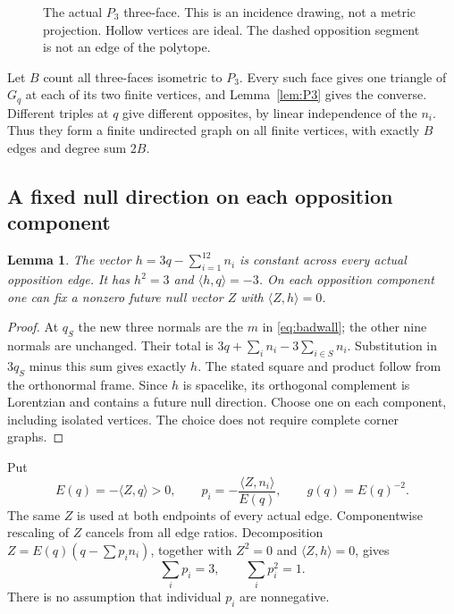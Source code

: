 \documentclass[11pt]{article}
\newtheorem{lemma}[theorem]{Lemma}
\newcommand{\ip}[2]{\langle #1,#2\rangle}
\newcommand{\Pthree}{P_3}
\begin{document}
\begin{figure}[ht]
\centering
{}
\caption{The actual $\Pthree$ three-face. This is an incidence drawing,
not a metric projection. Hollow vertices are ideal. The dashed
opposition segment is not an edge of the polytope.}
\label{fig:P3}
\end{figure}

Let $B$ count all three-faces isometric to $\Pthree$. Every such
face gives one triangle of $G_q$ at each of its two finite vertices,
and Lemma~\ref{lem:P3} gives the converse. Different triples at $q$
give different opposites, by linear independence of the $n_i$.
Thus they form a finite undirected graph on all finite vertices,
with exactly $B$ edges and degree sum $2B$.

\subsection{A fixed null direction on each opposition component}
\begin{lemma}\label{lem:invariant}
The vector $h=3q-\sum_{i=1}^{12}n_i$ is constant across every
actual opposition edge. It has $h^2=3$ and $\ip{h}{q}=-3$.
On each opposition component one can fix a nonzero future null
vector $Z$ with $\ip{Z}{h}=0$.
\end{lemma}
\begin{proof}
At $q_S$ the new three normals are the $m$ in
\eqref{eq:badwall}; the other nine normals are unchanged. Their
total is $3q+\sum_i n_i-3\sum_{i\in S}n_i$. Substitution in
$3q_S$ minus this sum gives exactly $h$. The stated square and
product follow from the orthonormal frame. Since $h$ is spacelike,
its orthogonal complement is Lorentzian and contains a future null
direction. Choose one on each component, including isolated vertices.
The choice does not require complete corner graphs.
\end{proof}
Put
\begin{equation}\label{eq:normalization}
 E(q)=-\ip{Z}{q}>0,\qquad
 p_i=-\frac{\ip{Z}{n_i}}{E(q)},\qquad g(q)=E(q)^{-2}.
\end{equation}
The same $Z$ is used at both endpoints of every actual edge.
Componentwise rescaling of $Z$ cancels from all edge ratios.
Decomposition $Z=E(q)(q-\sum p_i n_i)$, together with $Z^2=0$
and $\ip{Z}{h}=0$, gives
\begin{equation}\label{eq:p}
 \sum_i p_i=3,\qquad \sum_i p_i^2=1.
\end{equation}
There is no assumption that individual $p_i$ are nonnegative.
\end{document}
